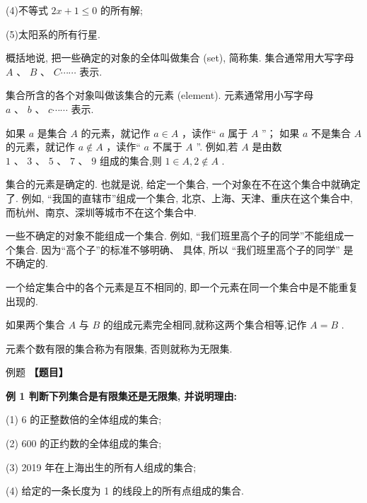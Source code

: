 \documentclass[a4paper,10pt,oneside,fontset=none]{ctexbook}
\renewcommand{\leq}{\leqslant}
\newcounter{example}[chapter]
\newenvironment{example}[1][]{\begin{exBox}{例题}{#1}}{\end{exBox}}
\numberwithin{equation}{chapter}
\begin{document}
(4)不等式 ${2x} + 1 \leq  0$ 的所有解;

(5)太阳系的所有行星.

概括地说, 把一些确定的对象的全体叫做集合 (set), 简称集. 集合通常用大写字母 $A\text{ 、 }B\text{ 、 }C\cdots \cdots$ 表示.

集合所含的各个对象叫做该集合的元素 (element). 元素通常用小写字母 $a\text{ 、 }b\text{ 、 }c\cdots \cdots$ 表示.

如果 $a$ 是集合 $A$ 的元素，就记作 $a \in  A$ ，读作“ $a$ 属于 $A$ ”； 如果 $a$ 不是集合 $A$ 的元素，就记作 $a \notin  A$ ，读作“ $a$ 不属于 $A$ ”. 例如,若 $A$ 是由数 $1\text{ 、 }3\text{ 、 }5\text{ 、 }7\text{ 、 }9$ 组成的集合,则 $1 \in  A,2 \notin  A$ .

集合的元素是确定的. 也就是说, 给定一个集合, 一个对象在不在这个集合中就确定了. 例如, “我国的直辖市”组成一个集合, 北京、上海、天津、重庆在这个集合中, 而杭州、南京、深圳等城市不在这个集合中.

一些不确定的对象不能组成一个集合. 例如, “我们班里高个子的同学”不能组成一个集合. 因为“高个子”的标准不够明确、 具体, 所以 “我们班里高个子的同学” 是不确定的.

一个给定集合中的各个元素是互不相同的, 即一个元素在同一个集合中是不能重复出现的.

如果两个集合 $A$ 与 $B$ 的组成元素完全相同,就称这两个集合相等,记作 $A = B$ .

元素个数有限的集合称为有限集, 否则就称为无限集.

\begin{example}
\textbf{【题目】}\par\vspace{0.3em}
\textbf{例 1 判断下列集合是有限集还是无限集, 并说明理由:}\par\vspace{0.3em}
\par
(1) 6 的正整数倍的全体组成的集合;
\par
(2) 600 的正约数的全体组成的集合;
\par
(3) 2019 年在上海出生的所有人组成的集合;
\par
(4) 给定的一条长度为 1 的线段上的所有点组成的集合.
\end{example}
\end{document}
